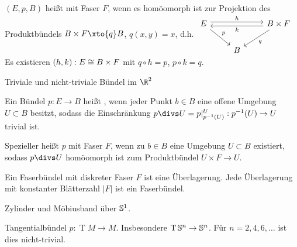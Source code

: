 \begin{df}
    $(E, p, B)$ heißt  mit Faser $F$, wenn es homöomorph ist zur Projektion des Produktbündels $B \times F \xto{q} B$, $q(x,y) = x$, d.h.
    \begin{math}
        \begin{tikzcd}
            E \ar[rr,"h",shift left] \ar[dr,"p"] & & B \times F \ar[ll,"k",shift left] \ar[ld,"q"] \\
            & B
        \end{tikzcd}
    \end{math}
    Es existieren $(h,k): E \homeomorphic B \times F$ mit $q \circ h = p$, $p \circ k = q$.
\end{df}

\begin{ex}
    Triviale und nicht-triviale Bündel im $\R^2$
\end{ex}

\begin{df}
    Ein Bündel $p: E \to B$ heißt , wenn jeder Punkt $b \in B$ eine offene Umgebung $U \subset B$ besitzt, sodass die Einschränkung $p \over U = p |_{p^{-1}(U)}^U : p^{-1}(U) \to U$ trivial ist.

    Spezieller heißt $p$  mit Faser $F$, wenn zu $b \in B$ eine Umgebung $U \subset B$ existiert, sodass $p \over U$ homöomorph ist zum Produktbündel $U \times F \to U$.
\end{df}

\begin{ex}
    Ein Faserbündel mit diskreter Faser $F$ ist eine Überlagerung.
    Jede Überlagerung mit konstanter Blätterzahl $|F|$ ist ein Faserbündel.
\end{ex}

\begin{ex}
    Zylinder und Möbiusband über $\S^1$.
\end{ex}

\begin{ex}
    Tangentialbündel $p: \operatorname{T} M \to M$.
    Insbesondere $\operatorname{T} \S^n \to \S^n$.
    Für $n = 2, 4, 6, \dotsc$ ist dies nicht-trivial.
\end{ex}

